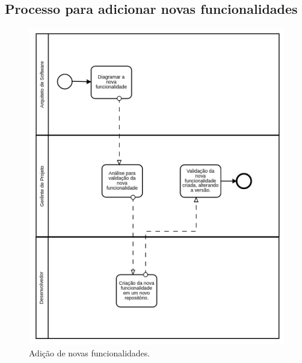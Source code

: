 \documentclass{article}
\begin{document}
        \subsection{Processo para adicionar novas funcionalidades}
			\begin{figure}[H]
				\includegraphics[width=\linewidth]{processo_nova_funcionalidade}
				\caption{Adição de novas funcionalidades.}
				\label{fig:processonovafuncionalidade}
			\end{figure}
\end{document}
